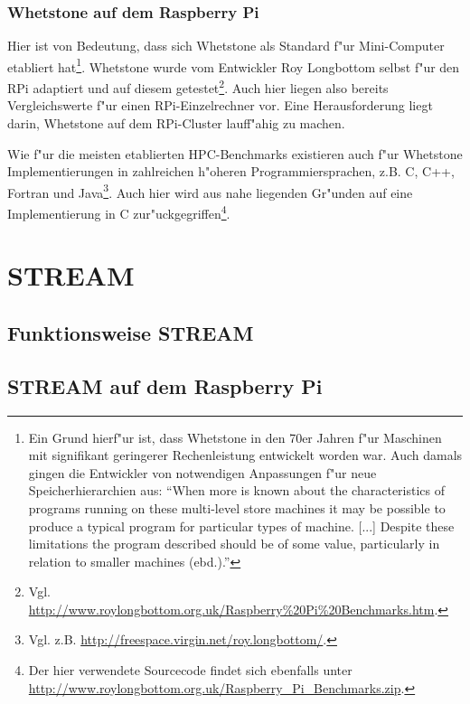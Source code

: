 
\subsubsection{Whetstone auf dem Raspberry Pi}\label{Whetstone RPi}

Hier ist von Bedeutung, dass sich Whetstone als Standard f"ur Mini-Computer etabliert hat\footnote{Ein Grund hierf"ur ist, dass Whetstone in den 70er Jahren f"ur Maschinen mit signifikant geringerer Rechenleistung entwickelt worden war. Auch damals gingen die Entwickler von notwendigen Anpassungen f"ur neue Speicherhierarchien aus: "`When more is known about the characteristics of programs running on these multi-level store machines it may be possible to produce a typical program for particular types of machine. [...] Despite these limitations the program described should be of some value, particularly in relation to smaller machines (ebd.)."'}. Whetstone wurde vom Entwickler Roy Longbottom selbst f"ur den RPi adaptiert und auf diesem getestet\footnote{Vgl. \url{http://www.roylongbottom.org.uk/Raspberry\%20Pi\%20Benchmarks.htm}.}. Auch hier liegen also bereits Vergleichswerte f"ur einen RPi-Einzelrechner vor. Eine Herausforderung liegt darin, Whetstone auf dem RPi-Cluster lauff"ahig zu machen. 

Wie f"ur die meisten etablierten HPC-Benchmarks existieren auch f"ur Whetstone Implementierungen in zahlreichen h"oheren Programmiersprachen, z.B. C, C++, Fortran und Java\footnote{Vgl. z.B. \url{http://freespace.virgin.net/roy.longbottom/}.}. Auch hier wird aus nahe liegenden Gr"unden auf eine Implementierung in C zur"uckgegriffen\footnote{Der hier verwendete Sourcecode findet sich ebenfalls unter \url{http://www.roylongbottom.org.uk/Raspberry_Pi_Benchmarks.zip}.}. 

\section{STREAM}\label{STREAM}

\subsection{Funktionsweise STREAM}\label{Funktionsweise STREAM}

\subsection{STREAM auf dem Raspberry Pi}\label{STREAM RPi}

